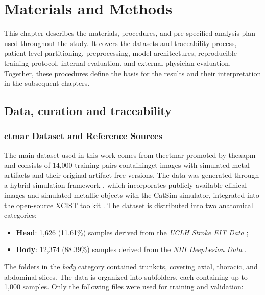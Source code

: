 \chapter{Materials and Methods}
\label{chap:final-methods}
This chapter describes the materials, procedures, and pre-specified analysis plan used throughout the study. It covers the datasets and traceability process, patient-level partitioning, preprocessing, model architectures, reproducible training protocol, internal evaluation, and external physician evaluation. Together, these procedures define the basis for the results and their interpretation in the subsequent chapters.

\section{Data, curation and traceability}
\subsection{\acrshort{ctmar} Dataset and Reference Sources}

The main dataset used in this work comes from the\acrfull{ctmar} \cite{hanedaAAPMCTMetal2025, AAPMCTMARBenchmarkTool} promoted by the\acrfull{aapm} and consists of 14,000 training pairs containing\acrshort{ct} images with simulated metal artifacts and their original artifact-free versions. The data was generated through a hybrid simulation framework \cite{petersHybridTrainingDatabase2025}, which incorporates publicly available clinical images and simulated metallic objects with the CatSim simulator, integrated into the open-source XCIST toolkit \cite{wuXCISTOpenAccess2022}. The dataset is distributed into two anatomical categories:

\begin{itemize}
    \item \textbf{Head}: 1,626 (11.61\%) samples derived from the \textit{UCLH Stroke EIT Data} \cite{gorenMultifrequencyElectricalImpedance2018, gorenUCLHStrokeEIT2017};
    \item \textbf{Body}: 12,374 (88.39\%) samples derived from the \textit{NIH DeepLesion Data} \cite{yanDeepLesionAutomatedMining2018}.
\end{itemize}

The folders in the \textit{body} category contained trunk\acrshort{ct}s, covering axial, thoracic, and abdominal slices. The data is organized into subfolders, each containing up to 1,000 samples. Only the following files were used for training and validation:

